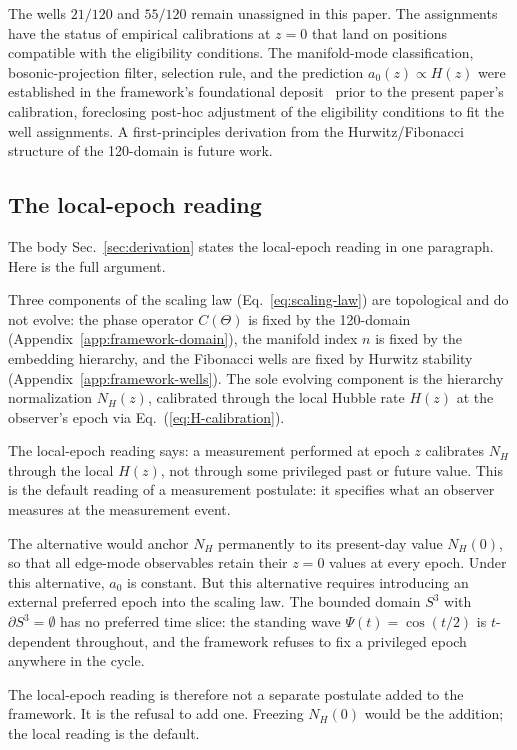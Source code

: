 \documentclass[
    aps,
    prd,
    reprint,
    superscriptaddress,
    nofootinbib,
    floatfix
]{revtex4-2}
\begin{document}
The wells $21/120$ and $55/120$ remain unassigned in this paper. The
assignments have the status of empirical calibrations at $z = 0$
that land on positions compatible with the eligibility conditions.
The manifold-mode classification, bosonic-projection filter,
selection rule, and the prediction $a_0(z) \propto H(z)$ were
established in the framework's foundational
deposit~\cite{ShattoMIT2025} prior to the present paper's
calibration, foreclosing post-hoc adjustment of the eligibility
conditions to fit the well assignments. A first-principles
derivation from the Hurwitz/Fibonacci structure of the 120-domain
is future work.

\subsection{The local-epoch reading}
\label{app:framework-localepoch}

The body Sec.~\ref{sec:derivation} states the local-epoch reading
in one paragraph. Here is the full argument.

Three components of the scaling law (Eq.~\ref{eq:scaling-law}) are
topological and do not evolve: the phase operator $C(\Theta)$ is
fixed by the 120-domain (Appendix~\ref{app:framework-domain}), the
manifold index $n$ is fixed by the embedding hierarchy, and the
Fibonacci wells are fixed by Hurwitz stability
(Appendix~\ref{app:framework-wells}). The sole evolving component
is the hierarchy normalization $N_H(z)$, calibrated through the
local Hubble rate $H(z)$ at the observer's epoch via
Eq.~(\ref{eq:H-calibration}).

The local-epoch reading says: a measurement performed at epoch $z$
calibrates $N_H$ through the local $H(z)$, not through some
privileged past or future value. This is the default reading of a
measurement postulate: it specifies what an observer measures at
the measurement event.

The alternative would anchor $N_H$ permanently to its present-day
value $N_H(0)$, so that all edge-mode observables retain their
$z = 0$ values at every epoch. Under this alternative, $a_0$ is
constant. But this alternative requires introducing an external
preferred epoch into the scaling law. The bounded domain $S^3$ with
$\partial S^3 = \emptyset$ has no preferred time slice: the
standing wave $\Psi(t) = \cos(t/2)$ is $t$-dependent throughout, and
the framework refuses to fix a privileged epoch anywhere in the
cycle.

The local-epoch reading is therefore not a separate postulate added
to the framework. It is the refusal to add one. Freezing $N_H(0)$
would be the addition; the local reading is the default.
\end{document}
